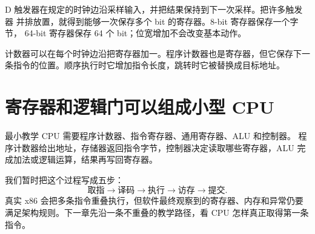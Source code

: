 D 触发器在规定的时钟边沿采样输入，并把结果保持到下一次采样。把许多触发器
并排放置，就得到能够一次保存多个 bit 的寄存器。8-bit 寄存器保存一个字节，
64-bit 寄存器保存 64 个 bit；位宽增加不会改变基本动作。

计数器可以在每个时钟边沿把寄存器加一。程序计数器也是寄存器，但它保存下一
条指令的位置。顺序执行时它增加指令长度，跳转时它被替换成目标地址。

\section{寄存器和逻辑门可以组成小型 CPU}

最小教学 CPU 需要程序计数器、指令寄存器、通用寄存器、ALU 和控制器。
程序计数器给出地址，存储器返回指令字节，控制器决定读取哪些寄存器，ALU
完成加法或逻辑运算，结果再写回寄存器。

我们暂时把这个过程写成五步：
\[
  \text{取指}\rightarrow\text{译码}\rightarrow\text{执行}
  \rightarrow\text{访存}\rightarrow\text{提交}.
\]
真实 x86 会把多条指令重叠执行，但软件最终观察到的寄存器、内存和异常仍要
满足架构规则。下一章先沿一条不重叠的教学路径，看 CPU 怎样真正取得第一条
指令。
